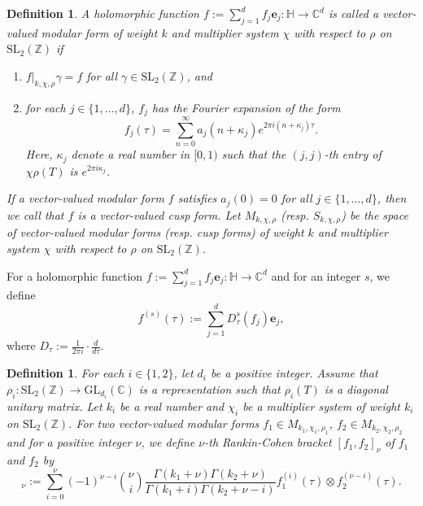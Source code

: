 \documentclass[11pt]{amsart}
\newtheorem{dfn}[thm]{Definition}
\theoremstyle{definition}
\theoremstyle{remark}
\numberwithin{equation}{section}
\renewcommand{\(}{\left(}
\renewcommand{\)}{\right)}
\def\GL{\mathrm{GL}}
\begin{document}
\begin{dfn}
    A holomorphic function $f:=\sum_{j=1}^{d} f_{j}\mathbf{e}_{j} : \mathbb{H}\to \mathbb{C}^{d}$ is called a vector-valued modular form of weight $k$ and multiplier system $\chi$ with respect to $\rho$ on $\mathrm{SL}_{2}(\mathbb{Z})$ if
    \begin{enumerate}
        \item $f|_{k,\chi,\rho} \gamma = f$ for all $\gamma\in \mathrm{SL}_{2}(\mathbb{Z})$, and
        \item for each $j\in \{1,\dots, d\}$, $f_{j}$ has the Fourier expansion of the form 
        \[ f_{j}(\tau)=\sum_{n=0}^{\infty} a_{j}(n+\kappa_j) e^{2\pi i (n+\kappa_j)\tau}. \]
        Here, $\kappa_{j}$ denote a real number in $[0,1)$ such that the $(j,j)$-th entry of  $\chi\rho\left(T\right)$ is $e^{2\pi i \kappa_{j}}$.
    \end{enumerate}
    If a vector-valued modular form $f$ satisfies $a_{j}(0)=0$ for all $j\in \{1,\dots,d\}$, then we call that $f$ is a vector-valued cusp form. 
    Let $M_{k,\chi,\rho}$ (resp. $S_{k,\chi,\rho}$) be the space of vector-valued modular forms (resp. cusp forms) of weight $k$ and multiplier system $\chi$ with respect to $\rho$ on $\mathrm{SL}_{2}(\mathbb{Z})$. 
\end{dfn}

  For a holomorphic function $f:=\sum_{j=1}^{d}f_j \mathbf{e}_{j}:\mathbb{H}\to \mathbb{C}^{d}$ and for an integer $s$, we define
    \[ f^{(s)}(\tau):=\sum_{j=1}^{d} D^s_{\tau} (f_j) \mathbf{e}_{j}, \]
    where $D_{\tau}:=\frac{1}{2\pi i}\cdot\frac{d}{d\tau}$.

\begin{dfn}\label{def 1}\cite[Definition 2.8]{NX}
    For each $i\in \{1,2\}$, let $d_i$ be a positive integer.
    Assume that $\rho_i : \mathrm{SL}_{2}(\mathbb{Z})\to \GL_{d_i}(\mathbb{C})$ is a representation such that $\rho_i(T)$ is a diagonal unitary matrix. 
    Let $k_i$ be a real number and $\chi_i$ be a multiplier system of weight $k_i$ on $\mathrm{SL}_{2}(\mathbb{Z})$.
    For two vector-valued modular forms $f_1\in M_{k_1,\chi_1,\rho_1}$, $f_2\in M_{k_2,\chi_2,\rho_2}$ and for a positive integer $\nu$, we define $\nu$-th Rankin-Cohen bracket $[f_1,f_2]_{\nu}$ of $f_1$ and $f_2$ by
    \begin{equation*}
        [f_1,f_2]_{\nu}:=\sum_{i=0}^{\nu}(-1)^{\nu-i}\binom{\nu}{i}\frac{\Gamma(k_1+\nu)\Gamma(k_2+\nu)}{\Gamma(k_1+i)\Gamma(k_2+\nu-i)}f_1^{(i)}(\tau) \otimes f_2^{(\nu-i)}(\tau).
    \end{equation*}
\end{dfn}
\end{document}
